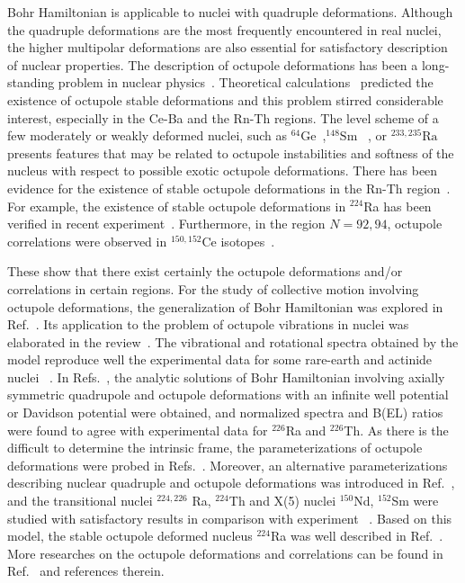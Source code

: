 \documentclass[twocolumn,prc,showpacs,preprintnumbers,superscriptaddress,floatfix]{revtex4}
\begin{document}
Bohr Hamiltonian is applicable to nuclei with quadruple deformations.
Although the quadruple deformations are the most frequently encountered in
real nuclei, the higher multipolar deformations are also essential for
satisfactory description of nuclear properties. The description of octupole
deformations has been a long-standing problem in nuclear physics~\cite%
{Butler96}. Theoretical calculations~\cite{Nazarewicz84,Nazarewicz92}
predicted the existence of octupole stable deformations and this problem
stirred considerable interest, especially in the Ce-Ba and the Rn-Th
regions. The level scheme of a few moderately or weakly deformed nuclei,
such as $^{64}\mathrm{Ge}$~\cite{Ennis91},$^{148}\mathrm{Sm}$~\cite{Urban91}%
, or $^{233,235}\mathrm{Ra}$~\cite{Chasman86} presents features that may be
related to octupole instabilities and softness of the nucleus with respect
to possible exotic octupole deformations. There has been evidence for the
existence of stable octupole deformations in the Rn-Th region~\cite%
{Cocks97,Cocks99}. For example, the existence of stable octupole
deformations in $^{224}$Ra has been verified in recent experiment~\cite%
{Gaffney13}. Furthermore, in the region $N=92,94$, octupole correlations
were observed in $^{150,152}$Ce isotopes~\cite{Zhu12,Li12}.

These show that there exist certainly the octupole deformations and/or
correlations in certain regions. For the study of collective motion
involving octupole deformations, the generalization of Bohr Hamiltonian was
explored in Ref.~\cite{Rohozinski82}. Its application to the problem of
octupole vibrations in nuclei was elaborated in the review~\cite%
{Rohozinski88}. The vibrational and rotational spectra obtained by the model
reproduce well the experimental data for some rare-earth and actinide nuclei~%
\cite{Dzyublik93,Denisov95}. In Refs.~\cite{Bonatsos05,Lenis06}, the
analytic solutions of Bohr Hamiltonian involving axially symmetric
quadrupole and octupole deformations with an infinite well potential or
Davidson potential were obtained, and normalized spectra and B(EL) ratios
were found to agree with experimental data for $^{226}$Ra and $^{226}$Th. As
there is the difficult to determine the intrinsic frame, the
parameterizations of octupole deformations were probed in Refs.~\cite%
{Rohozinski88,Rohozinski90,Hamamoto91,Wexler99}. Moreover, an alternative
parameterizations describing nuclear quadruple and octupole deformations was
introduced in Ref.~\cite{Bizzeti04}, and the transitional nuclei $^{224,226}$%
Ra, $^{224}$Th and X(5) nuclei $^{150}$Nd, $^{152}$Sm were studied with
satisfactory results in comparison with experiment~\cite{Bizzeti08,Bizzeti10}%
. Based on this model, the stable octupole deformed nucleus $^{224}$Ra was
well described in Ref.~\cite{Bizzeti13}. More researches on the octupole
deformations and correlations can be found in Ref.~\cite{Bonatsos15} and
references therein.
\end{document}
